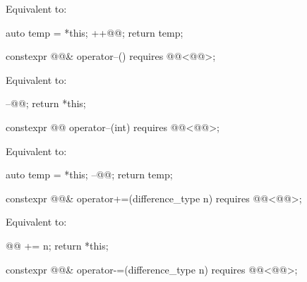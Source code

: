 \begin{itemdescr}
\pnum
\effects
Equivalent to:
\begin{codeblock}
auto temp = *this;
++@@;
return temp;
\end{codeblock}
\end{itemdescr}

%
\begin{itemdecl}
constexpr @@& operator--() requires @@<@@>;
\end{itemdecl}

\begin{itemdescr}
\pnum
\effects
Equivalent to:
\begin{codeblock}
--@@;
return *this;
\end{codeblock}
\end{itemdescr}

%
\begin{itemdecl}
constexpr @@ operator--(int) requires @@<@@>;
\end{itemdecl}

\begin{itemdescr}
\pnum
\effects
Equivalent to:
\begin{codeblock}
auto temp = *this;
--@@;
return temp;
\end{codeblock}
\end{itemdescr}

%
\begin{itemdecl}
constexpr @@& operator+=(difference_type n)
  requires @@<@@>;
\end{itemdecl}

\begin{itemdescr}
\pnum
\effects
Equivalent to:
\begin{codeblock}
@@ += n;
return *this;
\end{codeblock}
\end{itemdescr}

%
\begin{itemdecl}
constexpr @@& operator-=(difference_type n)
  requires @@<@@>;
\end{itemdecl}

